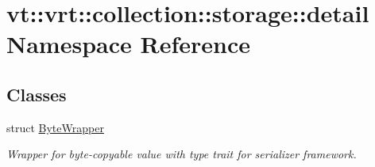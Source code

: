 \hypertarget{namespacevt_1_1vrt_1_1collection_1_1storage_1_1detail}{}\section{vt\+:\+:vrt\+:\+:collection\+:\+:storage\+:\+:detail Namespace Reference}
\label{namespacevt_1_1vrt_1_1collection_1_1storage_1_1detail}
\subsection*{Classes}
\begin{DoxyCompactItemize}
\item 
struct \hyperlink{structvt_1_1vrt_1_1collection_1_1storage_1_1detail_1_1_byte_wrapper}{Byte\+Wrapper}
\begin{DoxyCompactList}\small\item\em Wrapper for byte-\/copyable value with type trait for serializer framework. \end{DoxyCompactList}\end{DoxyCompactItemize}
